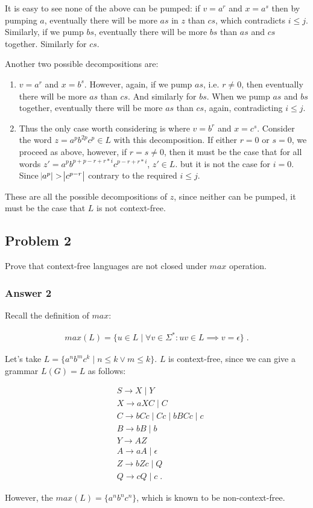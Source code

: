 \documentclass[11pt]{article}
\begin{document}
It is easy to see none of the above can be pumped: if $v = a^r$ and $x =
    a^s$ then by pumping $a$, eventually there will be more $as$ in $z$ than
$cs$, which contradicts $i \leq j$.  Similarly, if we pump $bs$, eventually
there will be more $bs$ than $as$ and $cs$ together.  Similarly for $cs$.

Another two possible decompositions are:
\begin{enumerate}
\item $v = a^r$ and $x = b^s$.  However, again, if we pump $as$, i.e. $r \neq
       0$, then eventually there will be more $as$ than $cs$.  And similarly for
$bs$.  When we pump $as$ and $bs$ together, eventually there will be more
$as$ than $cs$, again, contradicting $i \leq j$.
\item Thus the only case worth considering is where $v = b^r$ and $x = c^s$.
Consider the word $z = a^pb^{2p}c^p \in L$ with this decomposition.  If
either $r = 0$ or $s = 0$, we proceed as above, however, if $r = s \neq
       0$, then it must be the case that for all words $z' =
       a^pb^{p+p-r+r*i}c^{p-r+r*i}$, $z' \in L$. but it is not the case for
$i=0$.  Since $\abs{a^p} > \abs{c^{p-r}}$ contrary to the required $i
       \leq j$.
\end{enumerate}


These are all the possible decompositions of $z$, since neither can be
pumped, it must be the case that $L$ is not context-free.

\subsection{Problem 2}
\label{sec-1-2}
Prove that context-free languages are not closed under $max$ operation.

\subsubsection{Answer 2}
\label{sec-1-2-1}
Recall the definition of $max$:

\begin{align*}
  max(L) = \{u \in L \;|\; \forall v \in \Sigma^*: uv \in L \implies v = \epsilon\} \;.
\end{align*}

Let's take $L = \{a^nb^mc^k \;|\; n \leq k \lor m \leq k\}$.  $L$ is context-free,
since we can give a grammar $L(G) = L$ as follows:

\begin{align*}
  &S \to X \;|\; Y \\
  &X \to aXC \;|\; C \\
  &C \to bCc \;|\; Cc \;|\; bBCc \;|\; c \\
  &B \to bB \;|\; b \\
  &Y \to AZ \\
  &A \to aA \;|\; \epsilon \\
  &Z \to bZc \;|\; Q \\
  &Q \to cQ \;|\; c \;.
\end{align*}

However, the $max(L) = \{a^nb^nc^n\}$, which is known to be non-context-free.
\end{document}
